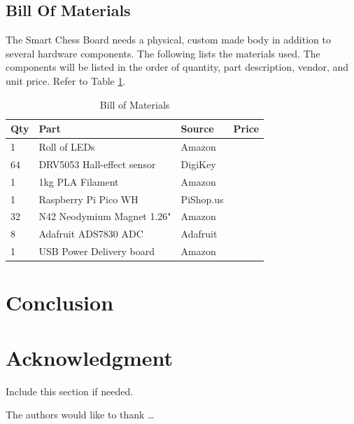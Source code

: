 \documentclass[11pt,journal]{IEEEtran}
\begin{document}
\subsection{Bill Of Materials}
The Smart Chess Board needs a physical, custom made body in addition to several hardware components. The following lists the materials used. The components will be listed in the order of quantity, part description, vendor, and unit price. Refer to Table \ref{bomtable}.
\begin{center}
\begin{table}[ht]
\caption{Bill of Materials}
\begin{tabular}{|l|l|l|l|}
\hline
\textbf{Qty} & \textbf{Part}                        & \textbf{Source} & \textbf{Price}          \\ \hline
1            & Roll of LEDs                         & Amazon          &                         \\ \hline
64           & DRV5053 Hall-effect  sensor          & DigiKey         &                         \\ \hline
1            & 1kg PLA Filament                     & Amazon          &                         \\ \hline
1            & Raspberry Pi Pico WH                 & PiShop.us       &                         \\ \hline
32           & N42 Neodymium Magnet 1.26"           & Amazon          &                         \\ \hline
8            & Adafruit ADS7830 ADC                 & Adafruit        &                         \\ \hline
1            & USB Power Delivery board             & Amazon          &                         \\ \hline
\end{tabular}
\label{bomtable}
\end{table}
\end{center}


% 


\section{Conclusion}



\section*{Acknowledgment}

Include this section if needed.

The authors would like to thank \ldots




\end{document}
